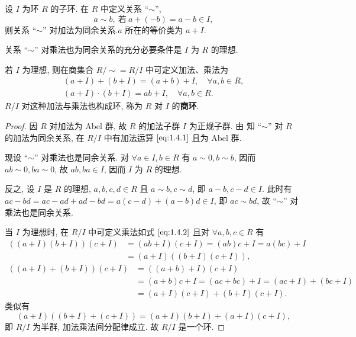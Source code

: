 \documentclass[../../main.tex]{subfiles}
\begin{document}
\begin{theorem}\label{theorem:抽象代数-定理 1.4.1}
设 \( I \) 为环 \( R \) 的子环. 在 \( R \) 中定义关系 “\(\sim\)”,
\[
a \sim b, \ 若\ a + (-b) = a - b \in I,
\]
则关系 “\(\sim\)” 对加法为同余关系.\( a \) 所在的等价类为 \( a + I \).

关系 “\(\sim\)” 对乘法也为同余关系的充分必要条件是 \( I \) 为 \( R \) 的理想.

若 \( I \) 为理想, 则在商集合 \( R/\sim = R/I \) 中可定义加法、乘法为
\begin{gather}
(a + I) + (b + I) = (a + b) + I, \quad \forall a,b \in R, \label{eq:1.4.1}
\\
(a + I) \cdot (b + I) = ab + I, \quad \forall a,b \in R. \label{eq:1.4.2}
\end{gather}
\( R/I \) 对这种加法与乘法也构成环, 称为 \( R \) 对 \( I \) 的\textbf{商环}.
\end{theorem}
\begin{proof}
因 \( R \) 对加法为 Abel 群, 故 \( R \) 的加法子群 \( I \) 为正规子群. 由 知 “\(\sim\)” 对 \( R \) 的加法为同余关系, 在 \( R/I \) 中有加法运算 \(\eqref{eq:1.4.1}\) 且为 Abel 群.

现设 “\(\sim\)” 对乘法也是同余关系. 对 \( \forall a \in I, b \in R \) 有 \( a \sim 0, b \sim b \), 因而 \( ab \sim 0, ba \sim 0 \), 故 \( ab, ba \in I \), 因而 \( I \) 为 \( R \) 的理想.

反之, 设 \( I \) 是 \( R \) 的理想, \( a,b,c,d \in R \) 且 \( a \sim b, c \sim d \), 即 \( a - b, c - d \in I \). 此时有 \( ac - bd = ac - ad + ad - bd = a(c - d) + (a - b)d \in I \), 即 \( ac \sim bd \), 故 “\(\sim\)” 对乘法也是同余关系.

当 \( I \) 为理想时, 在 \( R/I \) 中可定义乘法如式 \(\eqref{eq:1.4.2}\) 且对 \( \forall a,b,c \in R \) 有
\begin{align*}
((a + I)(b + I))(c + I) &= (ab + I)(c + I) = (ab)c + I = a(bc) + I \\
&= (a + I)((b + I)(c + I)),
\end{align*}
\begin{align*}
((a + I) + (b + I))(c + I) &= ((a + b) + I)(c + I) \\
&= (a + b)c + I = (ac + bc) + I = (ac + I) + (bc + I) \\
&= (a + I)(c + I) + (b + I)(c + I).
\end{align*}
类似有
\[
(a + I)((b + I) + (c + I)) = (a + I)(b + I) + (a + I)(c + I),
\]
即 \( R/I \) 为半群, 加法乘法间分配律成立. 故 \( R/I \) 是一个环.

\end{proof}
\end{document}
